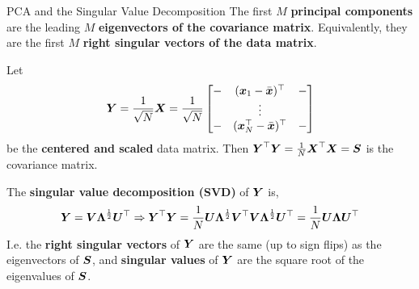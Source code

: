 \documentclass[aspectratio=169]{beamer}
\begin{document}

\begin{frame}[t]{PCA and the Singular Value Decomposition}
The first $M$ \textbf{principal components} are the leading $M$ \textbf{eigenvectors of the covariance matrix}. Equivalently, they are the first $M$ \textbf{right singular vectors of the data matrix}.

Let
\begin{align}
    \boldsymbol{Y} = \frac{1}{\sqrt{N}} \boldsymbol{X} = \frac{1}{\sqrt{N}} \begin{bmatrix}
    - & (\boldsymbol{x}_1 - \bar{\boldsymbol{x}})^\top & - \\
    & \vdots & \\
    - & (\boldsymbol{x}_N^\top  - \bar{\boldsymbol{x}})^\top & -
    \end{bmatrix}
\end{align}
be the \textbf{centered and scaled} data matrix. Then $\boldsymbol{Y}^\top \boldsymbol{Y} = \frac{1}{N} \boldsymbol{X}^\top \boldsymbol{X} = \boldsymbol{S}$ is the covariance matrix.

The \textbf{singular value decomposition (SVD)} of $\boldsymbol{Y}$ is,
\begin{align}
    \boldsymbol{Y} = \boldsymbol{V} \boldsymbol{\Lambda}^{\frac{1}{2}} \boldsymbol{U}^\top 
    \Rightarrow \boldsymbol{Y}^\top \boldsymbol{Y} = \frac{1}{N} \boldsymbol{U} \boldsymbol{\Lambda}^{\frac{1}{2}} \boldsymbol{V}^\top \boldsymbol{V} \boldsymbol{\Lambda}^{\frac{1}{2}} \boldsymbol{U}^\top 
    = \frac{1}{N} \boldsymbol{U} \boldsymbol{\Lambda} \boldsymbol{U}^\top
\end{align}
I.e. the \textbf{right singular vectors} of $\boldsymbol{Y}$ are the same (up to sign flips) as the eigenvectors of $\boldsymbol{S}$, and \textbf{singular values} of $\boldsymbol{Y}$ are the square root of the eigenvalues of $\boldsymbol{S}$.
\end{frame}
\end{document}
